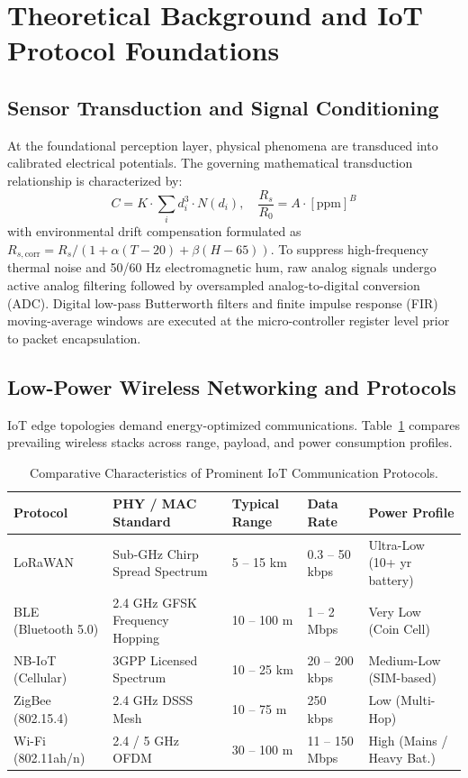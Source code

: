 \section{Theoretical Background and IoT Protocol Foundations}

\subsection{Sensor Transduction and Signal Conditioning}
At the foundational perception layer, physical phenomena are transduced into calibrated electrical potentials. The governing mathematical transduction relationship is characterized by:
\begin{equation}
  C = K \cdot \sum_{i} d_i^3 \cdot N(d_i), \quad \frac{R_s}{R_0} = A \cdot [\text{ppm}]^B
\label{eq:core_math}
\end{equation}
with environmental drift compensation formulated as $R_{s,\text{corr}} = R_s / (1 + \alpha(T - 20) + \beta(H - 65))$.
To suppress high-frequency thermal noise and 50/60 Hz electromagnetic hum, raw analog signals undergo active analog filtering followed by oversampled analog-to-digital conversion (ADC). Digital low-pass Butterworth filters and finite impulse response (FIR) moving-average windows are executed at the micro-controller register level prior to packet encapsulation.

\subsection{Low-Power Wireless Networking and Protocols}
IoT edge topologies demand energy-optimized communications. Table~\ref{tab:proto_comp} compares prevailing wireless stacks across range, payload, and power consumption profiles.
\begin{table}[H]
\centering
\caption{Comparative Characteristics of Prominent IoT Communication Protocols.}
\label{tab:proto_comp}
\begin{tabularx}{\linewidth}{lXXXX}
\toprule
\textbf{Protocol} & \textbf{PHY / MAC Standard} & \textbf{Typical Range} & \textbf{Data Rate} & \textbf{Power Profile} \\
\midrule
LoRaWAN & Sub-GHz Chirp Spread Spectrum & 5 -- 15 km & 0.3 -- 50 kbps & Ultra-Low (10+ yr battery) \\
BLE (Bluetooth 5.0) & 2.4 GHz GFSK Frequency Hopping & 10 -- 100 m & 1 -- 2 Mbps & Very Low (Coin Cell) \\
NB-IoT (Cellular) & 3GPP Licensed Spectrum & 10 -- 25 km & 20 -- 200 kbps & Medium-Low (SIM-based) \\
ZigBee (802.15.4) & 2.4 GHz DSSS Mesh & 10 -- 75 m & 250 kbps & Low (Multi-Hop) \\
Wi-Fi (802.11ah/n) & 2.4 / 5 GHz OFDM & 30 -- 100 m & 11 -- 150 Mbps & High (Mains / Heavy Bat.) \\
\bottomrule
\end{tabularx}
\end{table}

